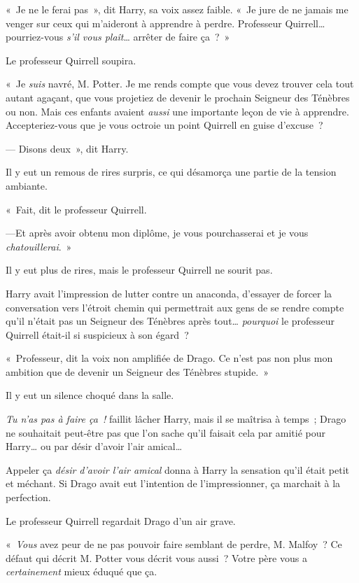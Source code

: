 «~Je ne le ferai pas~», dit Harry, sa voix assez faible.
«~Je jure de ne jamais me venger sur ceux qui m'aideront à apprendre à perdre.
Professeur Quirrell… pourriez-vous \emph{s'il vous plaît}… arrêter de faire ça~?~»

Le professeur Quirrell soupira.

«~Je \emph{suis} navré, M. Potter.
Je me rends compte que vous devez trouver cela tout autant agaçant, que vous projetiez de devenir le prochain Seigneur des Ténèbres ou non.
Mais ces enfants avaient \emph{aussi} une importante leçon de vie à apprendre.
Accepteriez-vous que je vous octroie un point Quirrell en guise d'excuse~?

--- Disons deux~», dit Harry.

Il y eut un remous de rires surpris, ce qui désamorça une partie de la tension ambiante.

«~Fait, dit le professeur Quirrell.

---Et après avoir obtenu mon diplôme, je vous pourchasserai et je vous \emph{chatouillerai}.~»

Il y eut plus de rires, mais le professeur Quirrell ne sourit pas.

Harry avait l'impression de lutter contre un anaconda, d'essayer de forcer la conversation vers l'étroit chemin qui permettrait aux gens de se rendre compte qu'il n'était pas un Seigneur des Ténèbres après tout…
\emph{pourquoi} le professeur Quirrell était-il si suspicieux à son égard~?

«~Professeur, dit la voix non amplifiée de Drago.
Ce n'est pas non plus mon ambition que de devenir un Seigneur des Ténèbres stupide.~»

Il y eut un silence choqué dans la salle.

\emph{Tu n'as pas à faire ça~!} faillit lâcher Harry, mais il se maîtrisa à temps~; Drago ne souhaitait peut-être pas que l'on sache qu'il faisait cela par amitié pour Harry… ou par désir d'avoir l'air amical…

Appeler ça \emph{désir d'avoir l'air amical} donna à Harry la sensation qu'il était petit et méchant.
Si Drago avait eut l'intention de l'impressionner, ça marchait à la perfection.

Le professeur Quirrell regardait Drago d'un air grave.

«~\emph{Vous} avez peur de ne pas pouvoir faire semblant de perdre, M. Malfoy~?
Ce défaut qui décrit M. Potter vous décrit vous aussi~?
Votre père vous a \emph{certainement} mieux éduqué que ça.

